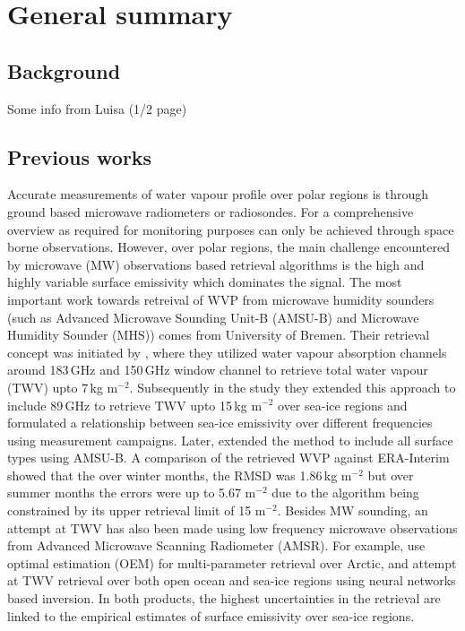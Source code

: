 \documentclass[12pt,oneside,a4paper]{article}
\begin{document}
	
	
	\thispagestyle{empty}
	\vspace*{-10mm}
	\noindent
	\textbf{\Large \LongTitle}




\section{General summary}

\subsection{Background}
%
\label{sec:background}
Some info from Luisa (1/2 page)

\subsection{Previous works}
%
\label{sec:previousworks}
Accurate measurements of water vapour profile over polar regions is through ground based microwave radiometers or radiosondes. For a comprehensive overview as required for monitoring purposes can only be achieved through space borne observations. However, over polar regions, the main challenge encountered by microwave (MW) observations based retrieval algorithms is the high and highly variable surface emissivity which dominates the signal. The most important work towards retreival of WVP from microwave humidity sounders (such as Advanced Microwave Sounding Unit-B (AMSU-B) and Microwave Humidity Sounder (MHS)) comes from University of Bremen. Their retrieval concept was initiated by \citet{miao:2001:atmos}, where they utilized water vapour absorption channels around 183\,GHz and  150\,GHz window channel to retrieve total water vapour (TWV) upto 7\,kg m$^{-2}$. Subsequently in the study \citep{} they extended this approach to include 89\,GHz to retrieve TWV upto 15\,kg m$^{-2}$ over sea-ice regions and formulated a relationship between sea-ice emissivity over different frequencies using measurement campaigns. Later, \cite{scarlat:2018:retri} extended the method to include all surface types using AMSU-B. A comparison of the retrieved WVP against ERA-Interim showed that the over winter months, the RMSD was  1.86\,kg m$^{-2}$ but over summer months the errors were up to 5.67 m$^{-2}$ due to the algorithm being constrained by its upper retrieval limit of 15 m$^{-2}$. Besides MW sounding, an attempt at TWV has also been made using low frequency microwave observations from Advanced Microwave Scanning Radiometer (AMSR). For example, \citet{scarlat:2017:exper} use optimal estimation (OEM) for multi-parameter retrieval over Arctic, and \citet{zabolotskikh:2020:anadv} attempt at TWV retrieval over both open ocean and sea-ice regions using neural networks based inversion. In both products, the highest uncertainties in the retrieval are linked to the empirical estimates of surface emissivity over sea-ice regions.
\end{document}
